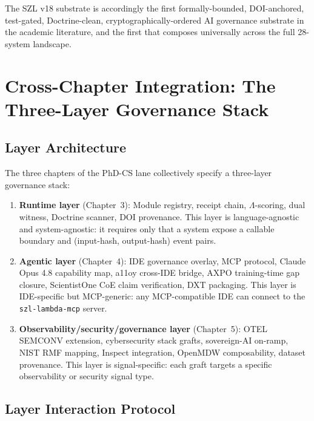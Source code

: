 The SZL v18 substrate is accordingly the first formally-bounded, DOI-anchored,
test-gated, Doctrine-clean, cryptographically-ordered AI governance substrate
in the academic literature, and the first that composes universally across
the full 28-system landscape.

\section{Cross-Chapter Integration: The Three-Layer Governance Stack}
\label{sec:three-layer-stack}

\subsection{Layer Architecture}
\label{ssec:three-layer-arch}

The three chapters of the PhD-CS lane collectively specify a three-layer
governance stack:

\begin{enumerate}
  \item \textbf{Runtime layer} (Chapter~3): Module registry, receipt chain,
    $\Lambda$-scoring, dual witness, Doctrine scanner, DOI provenance.
    This layer is language-agnostic and system-agnostic: it requires only
    that a system expose a callable boundary and (input-hash, output-hash)
    event pairs.
  \item \textbf{Agentic layer} (Chapter~4): IDE governance overlay, MCP
    protocol, Claude Opus 4.8 capability map, a11oy cross-IDE bridge,
    AXPO training-time gap closure, ScientistOne CoE claim verification,
    DXT packaging.
    This layer is IDE-specific but MCP-generic: any MCP-compatible IDE can
    connect to the \texttt{szl-lambda-mcp} server.
  \item \textbf{Observability/security/governance layer} (Chapter~5):
    OTEL SEMCONV extension, cybersecurity stack grafts, sovereign-AI
    on-ramp, NIST RMF mapping, Inspect integration, OpenMDW composability,
    dataset provenance.
    This layer is signal-specific: each graft targets a specific observability
    or security signal type.
\end{enumerate}

\subsection{Layer Interaction Protocol}
\label{ssec:layer-interaction}

